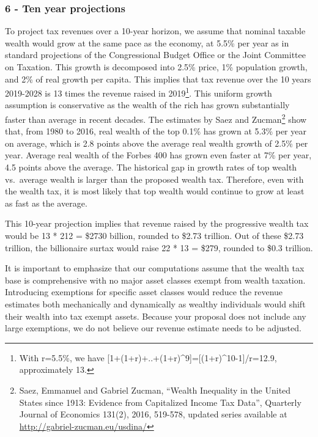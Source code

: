 \documentclass[]{article}
\let\rmarkdownfootnote\footnote%
\def\footnote{\protect\rmarkdownfootnote}
\begin{document}
\hypertarget{ten-year-projections}{%
\subsubsection{6 - Ten year projections}\label{ten-year-projections}}

To project tax revenues over a 10-year horizon, we assume that nominal
taxable wealth would grow at the same pace as the economy, at 5.5\% per
year as in standard projections of the Congressional Budget Office or
the Joint Committee on Taxation. This growth is decomposed into 2.5\%
price, 1\% population growth, and 2\% of real growth per capita. This
implies that tax revenue over the 10 years 2019-2028 is 13 times the
revenue raised in 2019\footnote{With r=5.5\%, we have
  {[}1+(1+r)+..+(1+r)\^{}9{]}={[}(1+r)\^{}10-1{]}/r=12.9, approximately
  13.}. This uniform growth assumption is conservative as the wealth of
the rich has grown substantially faster than average in recent decades.
The estimates by Saez and Zucman\footnote{Saez, Emmanuel and Gabriel
  Zucman, ``Wealth Inequality in the United States since 1913: Evidence
  from Capitalized Income Tax Data'', Quarterly Journal of Economics
  131(2), 2016, 519-578, updated series available at
  \url{http://gabriel-zucman.eu/usdina/}} show that, from 1980 to 2016,
real wealth of the top 0.1\% has grown at 5.3\% per year on average,
which is 2.8 points above the average real wealth growth of 2.5\% per
year. Average real wealth of the Forbes 400 has grown even faster at 7\%
per year, 4.5 points above the average. The historical gap in growth
rates of top wealth vs.~average wealth is larger than the proposed
wealth tax. Therefore, even with the wealth tax, it is most likely that
top wealth would continue to grow at least as fast as the average.

This 10-year projection implies that revenue raised by the progressive
wealth tax would be 13 * 212 = \$2730 billion, rounded to \$2.73
trillion. Out of these \$2.73 trillion, the billionaire surtax would
raise 22 * 13 = \$279, rounded to \$0.3 trillion.

It is important to emphasize that our computations assume that the
wealth tax base is comprehensive with no major asset classes exempt from
wealth taxation. Introducing exemptions for specific asset classes would
reduce the revenue estimates both mechanically and dynamically as
wealthy individuals would shift their wealth into tax exempt assets.
Because your proposal does not include any large exemptions, we do not
believe our revenue estimate needs to be adjusted.
\end{document}

